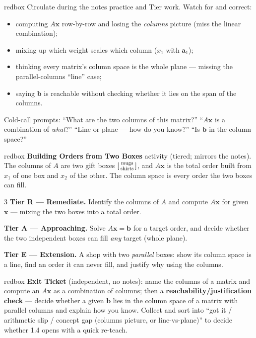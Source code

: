 \documentclass[10pt]{article}
\newcommand{\xx}{\mathbf{x}}
\newcommand{\bb}{\mathbf{b}}
\begin{document}
\begin{skillbox}{redbox}
Circulate during the notes practice and Tier work. Watch for and correct:
\begin{itemize}[leftmargin=1.2em, nosep]
  \item computing $A\xx$ row-by-row and losing the \emph{columns} picture (miss the linear combination);
  \item mixing up which weight scales which column ($x_1$ with $\mathbf{a}_1$);
  \item thinking every matrix's column space is the whole plane --- missing the parallel-columns ``line'' case;
  \item saying $\bb$ is reachable without checking whether it lies on the span of the columns.
\end{itemize}
Cold-call prompts: ``What are the two columns of this matrix?'' ``$A\xx$ is a combination of
\emph{what}?'' ``Line or plane --- how do you know?'' ``Is $\bb$ in the column space?''
\end{skillbox}

\begin{skillbox}{redbox}
\textbf{Building Orders from Two Boxes} activity (tiered; mirrors the notes). The columns of $A$
are two gift boxes $\begin{bsmallmatrix} \text{mugs} \\ \text{shirts} \end{bsmallmatrix}$, and
$A\xx$ is the total order built from $x_1$ of one box and $x_2$ of the other. The column space is
every order the two boxes can fill.
\begin{multicols}{3}
\textbf{Tier R --- Remediate.} Identify the columns of $A$ and compute $A\xx$ for given $\xx$ ---
mixing the two boxes into a total order.

\columnbreak
\textbf{Tier A --- Approaching.} Solve $A\xx=\bb$ for a target order, and decide whether the two
independent boxes can fill \emph{any} target (whole plane).

\columnbreak
\textbf{Tier E --- Extension.} A shop with two \emph{parallel} boxes: show its column space is a
line, find an order it can never fill, and justify why using the columns.
\end{multicols}
\end{skillbox}

\begin{skillbox}{redbox}
\textbf{Exit Ticket} (independent, no notes): name the columns of a matrix and compute an $A\xx$
as a combination of columns; then a \textbf{reachability/justification check} --- decide whether a
given $\bb$ lies in the column space of a matrix with parallel columns and explain how you know.
Collect and sort into ``got it / arithmetic slip / concept gap (columns picture, or line-vs-plane)''
to decide whether 1.4 opens with a quick re-teach.
\end{skillbox}
\end{document}
